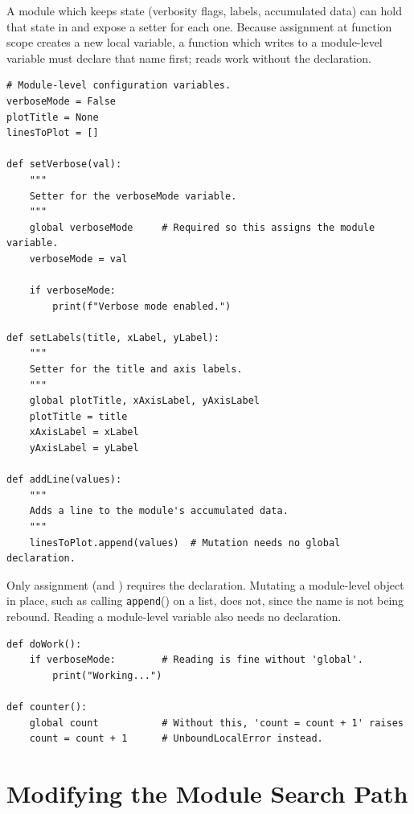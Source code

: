 A module which keeps  state (verbosity flags, labels, accumulated data) can hold that state in  and expose a setter for each one. Because assignment at function scope creates a new local variable, a function which writes to a module-level variable must declare that name  first; reads work without the declaration.
\begin{lstlisting}
# Module-level configuration variables.
verboseMode = False
plotTitle = None
linesToPlot = []

def setVerbose(val):
    """
    Setter for the verboseMode variable.
    """
    global verboseMode     # Required so this assigns the module variable.
    verboseMode = val

    if verboseMode:
        print(f"Verbose mode enabled.")

def setLabels(title, xLabel, yLabel):
    """
    Setter for the title and axis labels.
    """
    global plotTitle, xAxisLabel, yAxisLabel
    plotTitle = title
    xAxisLabel = xLabel
    yAxisLabel = yLabel

def addLine(values):
    """
    Adds a line to the module's accumulated data.
    """
    linesToPlot.append(values)  # Mutation needs no global declaration.
\end{lstlisting}
Only assignment (and ) requires the  declaration. Mutating a module-level object in place, such as calling \texttt{append}() on a list, does not, since the name is not being rebound. Reading a module-level variable also needs no declaration.
\begin{lstlisting}
def doWork():
    if verboseMode:        # Reading is fine without 'global'.
        print("Working...")

def counter():
    global count           # Without this, 'count = count + 1' raises
    count = count + 1      # UnboundLocalError instead.
\end{lstlisting}

\section{Modifying the Module Search Path}

